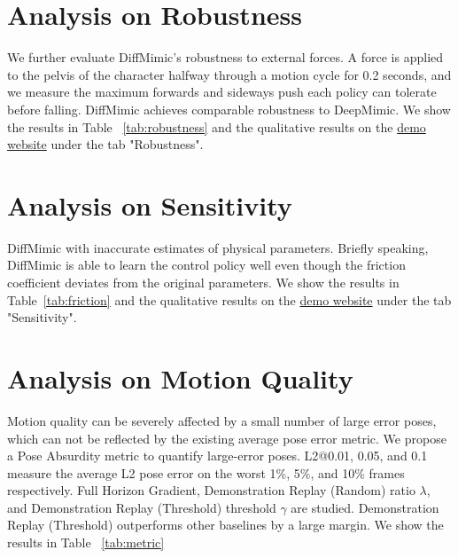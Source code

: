 \section{Analysis on Robustness}
We further evaluate DiffMimic's robustness to external forces. A force is applied to the pelvis of the character halfway through a motion cycle for 0.2 seconds, and we measure the maximum forwards and sideways push each policy can tolerate before falling. DiffMimic achieves comparable robustness to DeepMimic. We show the results in Table~ \ref{tab:robustness} and the qualitative results on the \href{https://diffmimic-demo-main-g7h0i8.streamlit.app/}{demo website} under the tab "Robustness".


\section{Analysis on Sensitivity}
DiffMimic with inaccurate estimates of physical parameters. Briefly speaking, DiffMimic is able to learn the control policy well even though the friction coefficient deviates from the original parameters. We show the results in Table~\ref{tab:friction} and the qualitative results on the \href{https://diffmimic-demo-main-g7h0i8.streamlit.app/}{demo website} under the tab "Sensitivity".



\section{{Analysis on Motion Quality}}
Motion quality can be severely affected by a small number of large error poses, which can not be reflected by the existing average pose error metric. We propose a Pose Absurdity metric to quantify large-error poses. L2@0.01, 0.05, and 0.1 measure the average L2 pose error on the worst 1\%, 5\%, and 10\% frames
respectively. Full Horizon Gradient, Demonstration Replay (Random) ratio $\lambda$, and Demonstration Replay (Threshold) threshold $\gamma$ are studied. Demonstration Replay (Threshold) outperforms other baselines by a large margin. We show the results in Table~ \ref{tab:metric}










